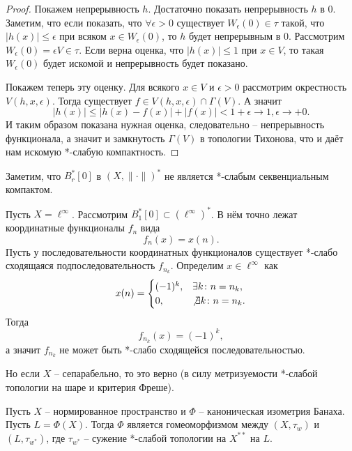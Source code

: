 \begin{proof}
    Покажем непрерывность $h$.
    Достаточно показать непрерывность $h$ в $0$.
    Заметим, что если показать, что $\forall \epsilon > 0$ существует $W_\epsilon(0) \in \tau$ такой, что $|h(x)| \leq \epsilon$ при всяком $x \in W_{\epsilon}(0)$, то $h$ будет непрерывным в $0$.
    Рассмотрим $W_\epsilon(0) = \epsilon V \in \tau$.
    Если верна оценка, что $|h(x)| \leq 1$ при $x \in V$, то такая $W_\epsilon(0)$ будет искомой и непрерывность будет показано.

    Покажем теперь эту оценку.
    Для всякого $x \in V$ и $\epsilon > 0$ рассмотрим окрестность $V(h, x, \epsilon)$.
    Тогда существует $f \in V(h, x, \epsilon) \cap \Gamma(V)$.
    А значит
    \[
        |h(x)| \leq |h(x) - f(x)| + |f(x)| < 1 + \epsilon \rightarrow 1, \epsilon \rightarrow +0.
    \]
    И таким образом показана нужная оценка, следовательно -- непрерывность функционала, а значит и замкнутость $\Gamma(V)$ в топологии Тихонова, что и даёт нам искомую *-слабую компактность.
\end{proof}
\begin{note}
    Заметим, что $B^*_r[0]$ в $(X, \|\cdot\|)^*$ не является *-слабым секвенциальным компактом.

    Пусть $X = \ell^{\infty}$.
    Рассмотрим $B_1^*[0] \subset (\ell^{\infty})^*$.
    В нём точно лежат координатные функционалы $f_n$ вида
    \[
        f_n(x) = x(n).
    \]
    Пусть у последовательности координатных функционалов существует *-слабо сходящаяся подпоследовательность $f_{n_k}$.
    Определим $x \in \ell^{\infty}$ как
    \[
        x(n) = \begin{cases}
        (-1)^k, & \exists k\colon n = n_k, \\
                   0, & \not\exists k\colon n = n_k.
        \end{cases}
    \]
    Тогда
    \[
        f_{n_k}(x) = (-1)^k,
    \]
    а значит $f_{n_k}$ не может быть *-слабо сходящейся последовательностью.

    Но если $X$ -- сепарабельно, то это верно (в силу метризуемости *-слабой топологии на шаре и критерия Фреше).
\end{note}
\begin{proposition}
    Пусть $X$ -- нормированное пространство и $\Phi$ -- каноническая изометрия Банаха.
    Пусть $L = \Phi(X)$.
    Тогда $\Phi$ является гомеоморфизмом между $(X, \tau_w)$ и $(L, \tau_{w^*})$, где $\tau_{w^*}$ -- сужение *-слабой топологии на $X^{**}$ на $L$.
\end{proposition}
